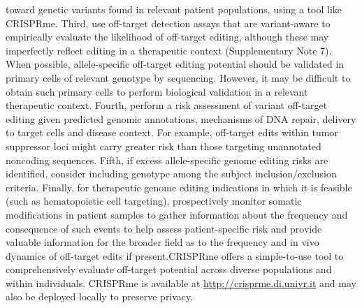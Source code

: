 \documentclass[a4paper, titlepage, openright]{book}
\newcommand{\crisprme}{CRISPRme\xspace}
\begin{document}
toward genetic variants found in relevant patient populations, using a tool like \crisprme \citep{cancellieri2023human}. Third, use off-target detection assays that are variant-aware to empirically evaluate the likelihood of off-target editing, although these may imperfectly reflect editing in a therapeutic context (Supplementary Note 7). When possible, allele-specific off-target editing potential should be validated in primary cells of relevant genotype by sequencing. However, it may be difficult to obtain such primary cells to perform biological validation in a relevant therapeutic context. Fourth, perform a risk assessment of variant off-target editing given predicted genomic annotations, mechanisms of DNA repair, delivery to target cells and disease context. For example, off-target edits within tumor suppressor loci might carry greater risk than those targeting unannotated noncoding sequences. Fifth, if excess allele-specific genome editing risks are identified, consider including genotype among the subject inclusion/exclusion criteria. Finally, for therapeutic genome editing indications in which it is feasible (such as hematopoietic cell targeting), prospectively monitor somatic modifications in patient samples to gather information about the frequency and consequence of such events to help assess patient-specific risk and provide valuable information for the broader field as to the frequency and in vivo dynamics of off-target edits if present.\crisprme offers a simple-to-use tool to comprehensively evaluate off-target potential across diverse populations and within individuals. \crisprme is available at \url{http://crisprme.di.univr.it} and may also be deployed locally to preserve privacy.
\end{document}
